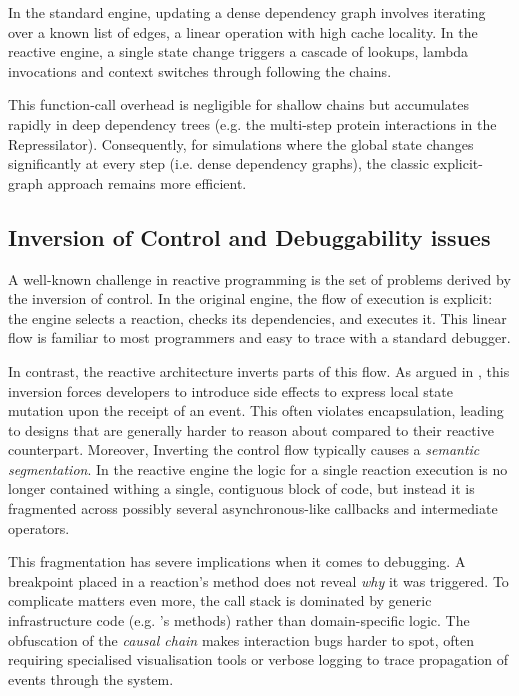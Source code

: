In the standard engine, updating a dense dependency graph involves iterating
over a known list of edges, a linear operation with high cache locality. In the
reactive engine, a single state change triggers a cascade of lookups, lambda
invocations and context switches through following the 
chains.

This function-call overhead is negligible for shallow chains but accumulates
rapidly in deep dependency trees (e.g. the multi-step protein interactions in
the Repressilator). Consequently, for simulations where the global state
changes significantly at every step (i.e. dense dependency graphs), the classic
explicit-graph approach remains more efficient.

\subsection{Inversion of Control and Debuggability issues}
A well-known challenge in reactive programming is the set of problems derived
by the inversion of control. In the original engine, the flow of execution is
explicit: the engine selects a reaction, checks its dependencies, and executes
it. This linear flow is familiar to most programmers and easy to trace with a
standard debugger.

In contrast, the reactive architecture inverts parts of this flow. As argued in
\cite{maier2010DOP}, this inversion forces developers to introduce side effects
to express local state mutation upon the receipt of an event. This often
violates encapsulation, leading to designs that are generally harder to reason
about compared to their reactive counterpart. Moreover, Inverting the control
flow typically causes a \emph{semantic segmentation}. In the reactive engine
the logic for a single reaction execution is no longer contained withing a
single, contiguous block of code, but instead it is fragmented across possibly
several asynchronous-like callbacks and intermediate operators.

This fragmentation has severe implications when it comes to debugging. A
breakpoint placed in a reaction's  method does not reveal
\emph{why} it was triggered. To complicate matters even more, the call stack is
dominated by generic infrastructure code (e.g. 's
methods) rather than domain-specific logic. The obfuscation of the \emph{causal
	chain} makes interaction bugs harder to spot, often requiring specialised
visualisation tools or verbose logging to trace propagation of events through
the system.


